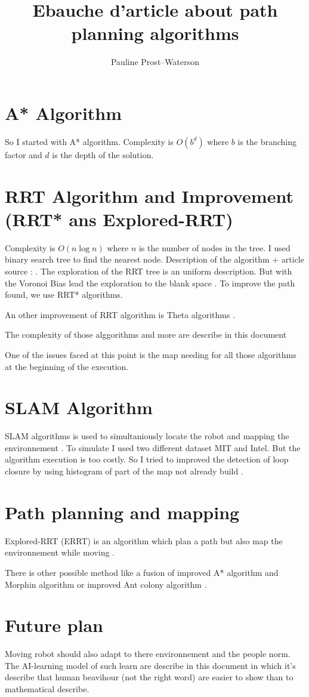 \documentclass{article}
\title{Ebauche d'article about path planning algorithms}
\author{Pauline Prost--Waterson}
\begin{document}
\maketitle
\section{A* Algorithm}
So I started with A* algorithm. Complexity is $O(b^d)$ where $b$ is the branching factor and $d$ is the depth of the solution.
\section{RRT Algorithm and Improvement (RRT* ans Explored-RRT)}
Complexity is $O(n \log n)$ where $n$ is the number of nodes in the tree. I used binary search tree to find the nearest node. Description of the algorithm + article source : \cite{RRTAlgorithmAndImprovement2024wu}.
The exploration of the RRT tree is an uniform description. But with the Voronoi Bias lead the exploration to the blank space \cite{lindemannIncrementallyReducingDispersion2004}.
To improve the path found, we use RRT* algorithms.

An other improvement of RRT algorithm is Theta algorithms \cite{ThetaAlgorithm2010daniel}.

The complexity of those alggorithms and more are describe in this document

One of the issues faced at this point is the map needing for all those algorithms at the beginning of the execution.

\section{SLAM Algorithm}
SLAM algorithms is used to simultaniously locate the robot and mapping the environnement \cite{}. To simulate I used two different dataset MIT and Intel. But the algorithm execution is too costly.
So I tried to improved the detection of loop closure by using histogram of part of the map not already build \cite{ExtractingStatisticalSignatures2022an}.

\section{Path planning and mapping}
Explored-RRT (ERRT) is an algorithm which plan a path but also map the environnement while moving \cite{ExplorationRRTMultiobjectivePath2021lindqvist}.

There is other possible method like a fusion of improved A* algorithm and Morphin algorithm \cite{AStarAndMorphinAlgorithm2019yi} or improved Ant colony algorithm \cite{ImprovedAntColony2018wang}.

\section{Future plan}
Moving robot should also adapt to there environnement and the people norm. The AI-learning model of such learn are describe in this document \cite{TeachingRobotNavigation2018perez-higueras} in which it's describe that human beavihour (not the right word) are easier to show than to mathematical describe.

\printbibliography
\end{document}
